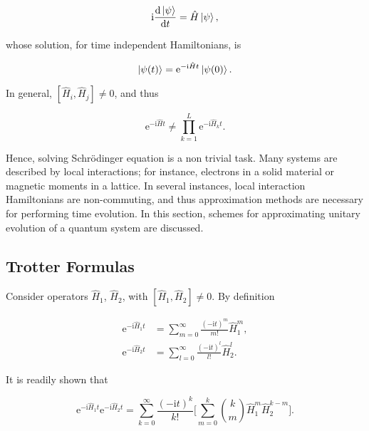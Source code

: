   \begin{equation}
    \mathrm{i}\dv{\ket{\psi}}{t} = \hat{H}\ket{\psi},
    \label{eq:Schrodinger}
  \end{equation}

  \noindent whose solution, for time independent Hamiltonians, is

  \begin{equation}
    \ket{\psi(t)} = \mathrm{e}^{-\mathrm{i}\hat{H}t}\ket{\psi(0)}
    \label{eq:schrodSolution}.
  \end{equation}
  
  In general, $[\hat{H}_i,\hat{H}_j] \neq 0$, and thus

  \begin{equation}
    \mathrm{e}^{-\mathrm{i}\hat{H}t} \neq \prod_{k = 1}^{L} \mathrm{e}^{-\mathrm{i}\hat{H}_kt}.
    \label{eq:CommuteUnit}
  \end{equation}

  Hence, solving Schrödinger equation is a non trivial task. Many systems are described by local interactions; for instance, electrons in a solid material or magnetic moments in a lattice. In several instances, local interaction Hamiltonians are non-commuting, and thus approximation methods are necessary for performing time evolution. In this section, schemes for approximating unitary evolution of a quantum system are discussed.

  \subsection{Trotter Formulas}
  \label{subsec:TrotterFormulas}

    Consider operators $\hat{H}_1$, $\hat{H}_2$, with $[\hat{H}_1,\hat{H}_2] \neq 0$. By definition

    \begin{align}
      \mathrm{e}^{-\mathrm{i}\hat{H}_1 t} & = \sum_{m = 0}^{\infty} \frac{(-\mathrm{i}t)^m}{m!}\hat{H}_1^m, \\
      \mathrm{e}^{-\mathrm{i}\hat{H}_2 t} & = \sum_{l = 0}^{\infty} \frac{(-\mathrm{i}t)^l}{l!}\hat{H}_2^l.
      \label{eq:ExpSeries}
    \end{align}

    It is readily shown that

    \begin{equation}
      \mathrm{e}^{-\mathrm{i}\hat{H}_1 t}\mathrm{e}^{-\mathrm{i}\hat{H}_2 t} = \sum_{k = 0}^{\infty} \frac{(-\mathrm{i}t)^k}{k!} \Bigg[\sum_{m = 0}^k \binom{k}{m} \hat{H}_1^m \hat{H}_2^{k-m}\Bigg].
      \label{eq:ExpProdExact}
    \end{equation}

